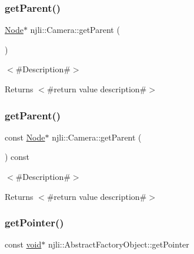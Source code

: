 \subsubsection{\texorpdfstring{get\+Parent()}{getParent()}\hspace{0.1cm}{\footnotesize\ttfamily [1/2]}}
{\footnotesize\ttfamily \mbox{\hyperlink{classnjli_1_1_node}{Node}}$\ast$ njli\+::\+Camera\+::get\+Parent (\begin{DoxyParamCaption}{ }\end{DoxyParamCaption})}

$<$\#\+Description\#$>$

\begin{DoxyReturn}{Returns}
$<$\#return value description\#$>$ 
\end{DoxyReturn}
\mbox{\label{classnjli_1_1_camera_afd2948456713ad894c519a6409f5e838}} 
\subsubsection{\texorpdfstring{get\+Parent()}{getParent()}\hspace{0.1cm}{\footnotesize\ttfamily [2/2]}}
{\footnotesize\ttfamily const \mbox{\hyperlink{classnjli_1_1_node}{Node}}$\ast$ njli\+::\+Camera\+::get\+Parent (\begin{DoxyParamCaption}{ }\end{DoxyParamCaption}) const}

$<$\#\+Description\#$>$

\begin{DoxyReturn}{Returns}
$<$\#return value description\#$>$ 
\end{DoxyReturn}
\mbox{\label{classnjli_1_1_camera_ac4ca71716ed832be357f15f8262c8448}} 
\subsubsection{\texorpdfstring{get\+Pointer()}{getPointer()}}
{\footnotesize\ttfamily const \mbox{\hyperlink{_thread_8h_af1e856da2e658414cb2456cb6f7ebc66}{void}}$\ast$ njli\+::\+Abstract\+Factory\+Object\+::get\+Pointer}

